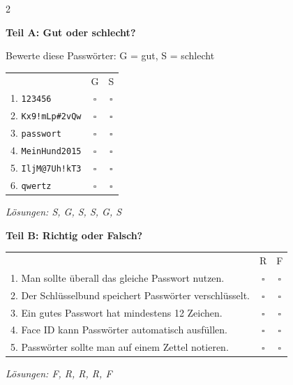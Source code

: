 \documentclass[a4paper,landscape,8pt]{extarticle}
\begin{document}
\begin{multicols}{2}

\textbf{\large Teil A: Gut oder schlecht?}

Bewerte diese Passwörter: G = gut, S = schlecht

\vspace{2mm}

\renewcommand{\arraystretch}{1.5}
\begin{tabular}{@{}p{5cm}cc@{}}
& G & S \\
1. \texttt{123456} & $\square$ & $\square$ \\
2. \texttt{Kx9!mLp\#2vQw} & $\square$ & $\square$ \\
3. \texttt{passwort} & $\square$ & $\square$ \\
4. \texttt{MeinHund2015} & $\square$ & $\square$ \\
5. \texttt{IljM@7Uh!kT3} & $\square$ & $\square$ \\
6. \texttt{qwertz} & $\square$ & $\square$ \\
\end{tabular}
\renewcommand{\arraystretch}{1}

\textit{\footnotesize Lösungen: S, G, S, S, G, S}

\vspace{4mm}

\textbf{\large Teil B: Richtig oder Falsch?}

\vspace{2mm}

\renewcommand{\arraystretch}{1.4}
\begin{tabular}{@{}p{7.5cm}cc@{}}
& R & F \\
1. Man sollte überall das gleiche Passwort nutzen. & $\square$ & $\square$ \\
2. Der Schlüsselbund speichert Passwörter verschlüsselt. & $\square$ & $\square$ \\
3. Ein gutes Passwort hat mindestens 12 Zeichen. & $\square$ & $\square$ \\
4. Face ID kann Passwörter automatisch ausfüllen. & $\square$ & $\square$ \\
5. Passwörter sollte man auf einem Zettel notieren. & $\square$ & $\square$ \\
\end{tabular}
\renewcommand{\arraystretch}{1}

\textit{\footnotesize Lösungen: F, R, R, R, F}

\vspace{4mm}


\end{multicols}
\end{document}
